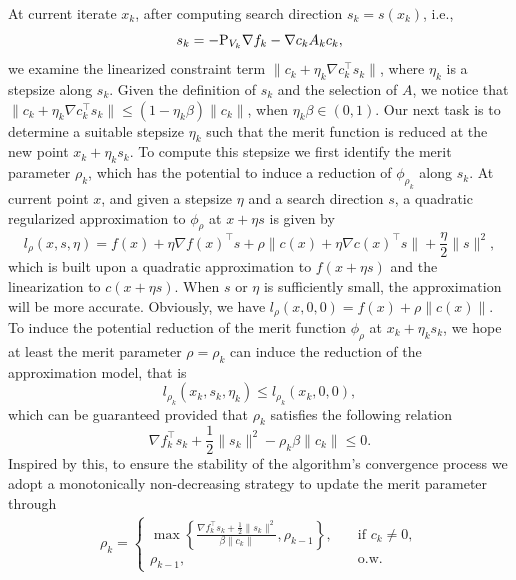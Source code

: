 \documentclass[11pt]{article}
\newcommand{\be}{\begin{equation}}
\newcommand{\ee}{\end{equation}}
\begin{document}
At current iterate \(x_k\), after computing search direction {\(s_k=s(x_k)\)}, i.e.,
\be\label{s_k}
s_k = -{\rm P}_{V_k}\nabla f_k - \nabla c_k A_k c_k,
\ee
we examine the linearized constraint term $\|c_k + \eta_k \nabla c_k^\top s_k\|$, where $\eta_k $ is a stepsize along $s_k$. Given the definition of $s_k$ and the selection of  $A$, we {notice} that $\|c_k + \eta_k \nabla c_k^\top s_k\| \leq (1 - \eta_k \beta) \|c_k\|$, when $\eta_k \beta \in (0, 1)$. Our next task is to determine a suitable stepsize $\eta_k$ such that the merit function is reduced at the new point $x_k+\eta_ks_k$. To compute this stepsize we first identify the merit parameter  $\rho_k$, which has the potential to induce a reduction of $\phi_{\rho_k}$ along $s_k$. At current point $x$, and given a stepsize $\eta$ and a search direction $s$, a quadratic regularized approximation to   $\phi_{\rho}$ at $x+\eta s$ is given by  
\be\label{approx}
l_{\rho}(x,s,\eta) = f(x) + \eta \nabla f(x)^\top s + \rho \|c(x) + \eta \nabla c(x)^\top s\| + \frac{\eta}{2}\|s\|^2,
\ee
which is built upon a quadratic approximation to   $f(x+\eta s)$ and the linearization to $c(x+\eta s)$. When $s$ or $\eta$ is sufficiently small, the approximation    will be more accurate. Obviously, we have $ l_{\rho} (x,0,0)= f(x) + \rho \| c(x)\|.$  
To induce the potential reduction of the merit function $\phi_\rho$ at $x_k+\eta_ks_k$, we hope at least the merit parameter $\rho=\rho_k$ can induce the reduction of the approximation model, that is
\[l_{\rho_k}(x_k, s_k,\eta_k) \leq l_{\rho_k} (x_k,0,0) ,\] which can be guaranteed provided that $\rho_k$ satisfies the following relation
\be\label{ine}
    \nabla f_k^\top s_k + \frac{1}{2}\|s_k\|^2 - \rho_k \beta \|c_k\| \leq 0.
\ee
Inspired by this, to ensure the stability of the algorithm's convergence process we adopt a monotonically non-decreasing strategy to update the merit parameter through
\begin{align}\label{eq:rhok}
    \rho_k = \begin{cases}\max \left\{ \frac{\nabla f_k^\top s_k + \frac{1}{2}\|s_k\|^2}{\beta \|c_k\|}, \rho_{k-1} \right\}, &\quad \mbox{if } c_k\neq 0,\\
    \rho_{k-1}, &\quad \mbox{o.w.}
    \end{cases}
\end{align}
\end{document}

